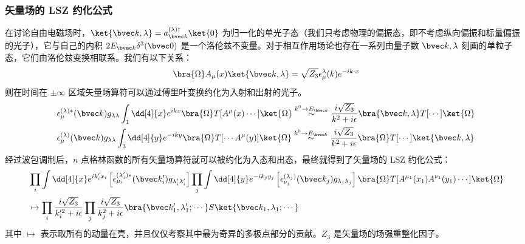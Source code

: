 \subsubsection{矢量场的 LSZ 约化公式}
在讨论自由电磁场时，$\ket{\bvec k,\lambda}=a_{\bvec k}^{(\lambda)\dagger}\ket{0}$ 为归一化的单光子态（我们只考虑物理的偏振态，即不考虑纵向偏振和标量偏振的光子），它与自己的内积 $2E_{\bvec k}\delta^3(\bvec 0)$ 是一个洛伦兹不变量。对于相互作用场论也存在一系列由量子数 $\bvec k,\lambda$ 刻画的单粒子态，它们由洛伦兹变换相联系。我们有以下关系：
\[
\bra{\Omega}A_\mu(x)\ket{\bvec k,\lambda}=\sqrt{Z_3}\epsilon_\mu^{\lambda}(k)e^{-ik\cdot x}
\]
则在时间在 $\pm \infty$ 区域矢量场算符可以通过傅里叶变换约化为入射和出射的光子。
\begin{equation}
\begin{aligned}
&\epsilon_\mu^{(\lambda)*}(\bvec k)g_{\lambda\lambda}\int_{ 1} \dd[4]{x} e^{ikx} \bra{\Omega}T[A^\mu(x)\cdots]\ket{\Omega}
\stackrel{k^0\rightarrow E_{\bvec k}}{\sim}
\frac{i\sqrt{Z_3}}{k^2+i\epsilon} \bra{\bvec k,\lambda} T[\cdots]\ket{\Omega}
\\
&
\epsilon_\mu^{(\lambda)}(\bvec k)g_{\lambda\lambda}
\int_{3} \dd[4]{y} e^{-iky}
\bra{\Omega}T[\cdots A^\mu(y)]\ket{ \Omega}
\stackrel{k^0\rightarrow E_{\bvec k}}{\sim}
\frac{i\sqrt{Z_3}}{k^2+i\epsilon}\bra{\Omega} T[\cdots]\ket{\bvec k,\lambda}
\end{aligned}
\end{equation}
经过波包调制后，$n$ 点格林函数的所有矢量场算符就可以被约化为入态和出态，最终就得到了矢量场的 LSZ 约化公式：
\begin{equation}
\begin{aligned}
&\prod_{i}\int \dd[4]{x} e^{ik'_ix_i} 
\left[\epsilon_{\mu_i}^{(\lambda'_i)*}(\bvec k'_i)g_{\lambda'_i\lambda'_i}\right] 
\prod_{j}\int \dd[4]{y} e^{-ik_jy_j}  \left[\epsilon_{\nu_j}^{(\lambda_j)}(\bvec k_j) g_{\lambda_j\lambda_j}\right]
\bra{\Omega}T[A^{\mu_1}(x_1)A^{\nu_1}(y_1)\cdots]\ket{\Omega}
\\
&\mapsto \prod_i\frac{i\sqrt{Z_3}}{k_i'^2+i\epsilon}\prod_j \frac{i\sqrt{Z_3}}{k_j^2+i\epsilon}\bra{\bvec k'_1,\lambda'_1;\cdots}S\ket{\bvec k_1,\lambda_1;\cdots}
\end{aligned}
\end{equation}
其中 $\mapsto$ 表示取所有的动量在壳，并且仅仅考察其中最为奇异的多极点部分的贡献。$Z_3$ 是矢量场的场强重整化因子。

